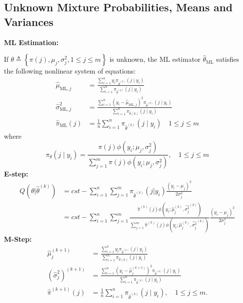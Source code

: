 \documentclass[11pt]{elegantbook}
\begin{document}
\subsection{Unknown Mixture Probabilities, Means and Variances}
\textbf{ML Estimation:}

If $\theta \triangleq\left\{\pi(j), \mu_j, \sigma_j^2, 1 \leq j \leq m\right\}$ is unknown, the ML estimator $\hat{\theta}_{\mathrm{ML}}$ satisfies the following nonlinear system of equations:
$$
\begin{aligned}
\hat{\mu}_{\mathrm{ML}, j} &=\frac{\sum_{i=1}^n y_i \pi_{\hat{\theta}^{(k)}}\left(j \mid y_i\right)}{\sum_{i=1}^n \pi_{\hat{\theta}^{(k)}}\left(j \mid y_i\right)} \\
\hat{\sigma}_{\mathrm{ML}, j}^2 &=\frac{\sum_{i=1}^n\left(y_i-\hat{\mu}_{\mathrm{ML}, j}\right)^2 \pi_{\hat{\theta}^{(k)}}\left(j \mid y_i\right)}{\sum_{i=1}^n \pi_{\hat{\theta}(k)}\left(j \mid y_i\right)} \\
\hat{\pi}_{\mathrm{ML}}(j) &=\frac{1}{n} \sum_{i=1}^n \pi_{\hat{\theta}^{(k)}}\left(j \mid y_i\right) \quad 1 \leq j \leq m
\end{aligned}
$$
where
$$
\pi_\theta\left(j \mid y_i\right)=\frac{\pi(j) \phi\left(y_i ; \mu_j, \sigma_j^2\right)}{\sum_{j=1}^m \pi(j) \phi\left(y_i ; \mu_j, \sigma_j^2\right)}, \quad 1 \leq j \leq m
$$
\textbf{E-step:}
\begin{equation}
    \begin{aligned}
        Q(\theta|\hat{\theta}^{(k)})
        &=cst-\sum_{i=1}^n\sum_{j=1}^m\pi_{\hat{\theta}^{(k)}}(j|y_i)\frac{(y_i-\mu_j)^2}{2\sigma_j^2}\\
        &=cst-\sum_{i=1}^n\sum_{j=1}^m\frac{\hat{\pi}^{(k)}(j)\phi(y_i ; \hat{\mu}_j^{(k)}, \hat{\sigma_j^2}^{(k)})}{\sum_{j=1}^m\hat{\pi}^{(k)}(j)\phi(y_i ; \hat{\mu}_j^{(k)}, \hat{\sigma_j^2}^{(k)})}\frac{(y_i-\mu_j)^2}{2\sigma_j^2}
    \end{aligned}
    \nonumber
\end{equation}
\textbf{M-Step:}
\begin{equation}
    \begin{aligned}
        \hat{\mu}_j^{(k+1)} &=\frac{\sum_{i=1}^n y_i \pi_{\hat{\theta}^{(k)}}\left(j \mid y_i\right)}{\sum_{i=1}^n \pi_{\hat{\theta}(k)}\left(j \mid y_i\right)} \\
        \left(\hat{\sigma}_j^2\right)^{(k+1)} &=\frac{\sum_{i=1}^n\left(y_i-\hat{\mu}_j^{(k+1)}\right)^2 \pi_{\hat{\theta}^{(k)}}\left(j \mid y_i\right)}{\sum_{i=1}^n \pi_{\hat{\theta}^{(k)}}\left(j \mid y_i\right)} \\
        \hat{\pi}^{(k+1)}(j) &=\frac{1}{n} \sum_{i=1}^n \pi_{\hat{\theta}^{(k)}}\left(j \mid y_i\right), \quad 1 \leq j \leq m .
    \end{aligned}
    \nonumber
\end{equation}
\end{document}
